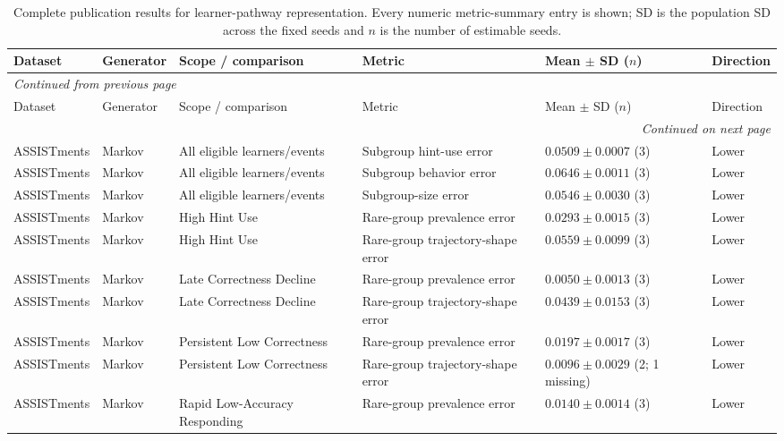 \scriptsize
\setlength{\tabcolsep}{3pt}
\begin{longtable}{@{}p{2.25cm}p{2.05cm}p{4.7cm}p{5.0cm}p{2.6cm}p{1.25cm}@{}}
\caption{Complete publication results for learner-pathway representation. Every numeric metric-summary entry is shown; SD is the population SD across the fixed seeds and $n$ is the number of estimable seeds.}\label{tab:supp-learner-pathway-representation}\\
\toprule
Dataset & Generator & Scope / comparison & Metric & Mean $\pm$ SD ($n$) & Direction \\
\midrule
\endfirsthead
\multicolumn{6}{l}{\textit{Continued from previous page}}\\
\toprule
Dataset & Generator & Scope / comparison & Metric & Mean $\pm$ SD ($n$) & Direction \\
\midrule
\endhead
\midrule
\multicolumn{6}{r}{\textit{Continued on next page}}\\
\endfoot
\bottomrule
\endlastfoot
ASSISTments & Markov & All eligible learners/events & Subgroup hint-use error & $0.0509 \mathbin{\pm} 0.0007$ (3) & Lower \\
ASSISTments & Markov & All eligible learners/events & Subgroup behavior error & $0.0646 \mathbin{\pm} 0.0011$ (3) & Lower \\
ASSISTments & Markov & All eligible learners/events & Subgroup-size error & $0.0546 \mathbin{\pm} 0.0030$ (3) & Lower \\
ASSISTments & Markov & High Hint Use & Rare-group prevalence error & $0.0293 \mathbin{\pm} 0.0015$ (3) & Lower \\
ASSISTments & Markov & High Hint Use & Rare-group trajectory-shape error & $0.0559 \mathbin{\pm} 0.0099$ (3) & Lower \\
ASSISTments & Markov & Late Correctness Decline & Rare-group prevalence error & $0.0050 \mathbin{\pm} 0.0013$ (3) & Lower \\
ASSISTments & Markov & Late Correctness Decline & Rare-group trajectory-shape error & $0.0439 \mathbin{\pm} 0.0153$ (3) & Lower \\
ASSISTments & Markov & Persistent Low Correctness & Rare-group prevalence error & $0.0197 \mathbin{\pm} 0.0017$ (3) & Lower \\
ASSISTments & Markov & Persistent Low Correctness & Rare-group trajectory-shape error & $0.0096 \mathbin{\pm} 0.0029$ (2; 1 missing) & Lower \\
ASSISTments & Markov & Rapid Low-Accuracy Responding & Rare-group prevalence error & $0.0140 \mathbin{\pm} 0.0014$ (3) & Lower \\

\end{longtable}
